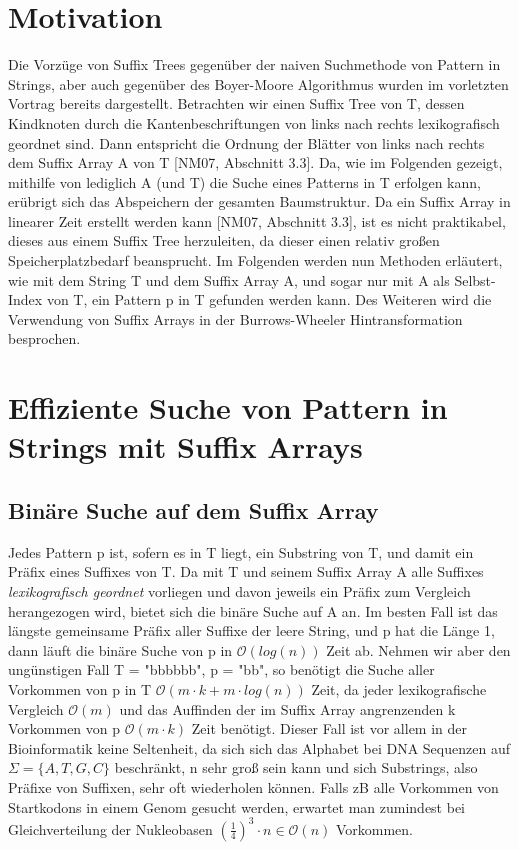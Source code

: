 \documentclass[12pt,twoside]{article}
\begin{document}
\section{Motivation}
Die Vorzüge von Suffix Trees gegenüber der naiven Suchmethode von Pattern in Strings, aber auch gegenüber des Boyer-Moore Algorithmus wurden im vorletzten Vortrag bereits dargestellt.
Betrachten wir einen Suffix Tree von T, dessen Kindknoten durch die Kantenbeschriftungen von links nach rechts lexikografisch geordnet sind. Dann entspricht die Ordnung der Blätter von links nach rechts dem Suffix Array A von T [NM07, Abschnitt 3.3]. Da, wie im Folgenden gezeigt, mithilfe von lediglich A (und T) die Suche eines Patterns in T erfolgen kann, erübrigt sich das Abspeichern der gesamten Baumstruktur. Da ein Suffix Array in linearer Zeit erstellt werden kann [NM07, Abschnitt 3.3], ist es nicht praktikabel, dieses aus einem Suffix Tree herzuleiten, da dieser einen relativ großen Speicherplatzbedarf beansprucht. Im Folgenden werden nun Methoden erläutert, wie mit dem String T und dem Suffix Array A, und sogar nur mit A als Selbst-Index von T, ein Pattern p in T gefunden werden kann. Des Weiteren wird die Verwendung von Suffix Arrays in der Burrows-Wheeler Hintransformation besprochen.

\section{Effiziente Suche von Pattern in Strings mit Suffix Arrays}
\subsection{Binäre Suche auf dem Suffix Array}
Jedes Pattern p ist, sofern es in T liegt, ein Substring von T, und damit ein Präfix eines Suffixes von T. Da mit T und seinem Suffix Array A alle Suffixes \textit{lexikografisch geordnet} vorliegen und davon jeweils ein Präfix zum Vergleich herangezogen wird, bietet sich die binäre Suche auf A an. Im besten Fall ist das längste gemeinsame Präfix aller Suffixe der leere String, und p hat die Länge 1, dann läuft die binäre Suche von p in $\mathcal{O}(log (n))$ Zeit ab. Nehmen wir aber den ungünstigen Fall T =  "bbbbbb", p = "bb", so benötigt die Suche aller Vorkommen von p in T $\mathcal{O}(m\cdot k + m\cdot log(n))$ Zeit, da jeder lexikografische Vergleich $\mathcal{O}(m)$ und das Auffinden der im Suffix Array angrenzenden k Vorkommen von p $\mathcal{O}(m\cdot k)$ Zeit benötigt. Dieser Fall ist vor allem in der Bioinformatik keine Seltenheit, da sich sich das Alphabet bei DNA Sequenzen auf $\Sigma = \{A,T,G,C\}$ beschränkt, n sehr groß sein kann und sich Substrings, also Präfixe von Suffixen, sehr oft wiederholen können. Falls zB alle Vorkommen von Startkodons in einem Genom gesucht werden, erwartet man zumindest bei Gleichverteilung der Nukleobasen $(\frac{1}{4})^{3}\cdot n \in \mathcal{O}(n)$ Vorkommen.
\end{document}
